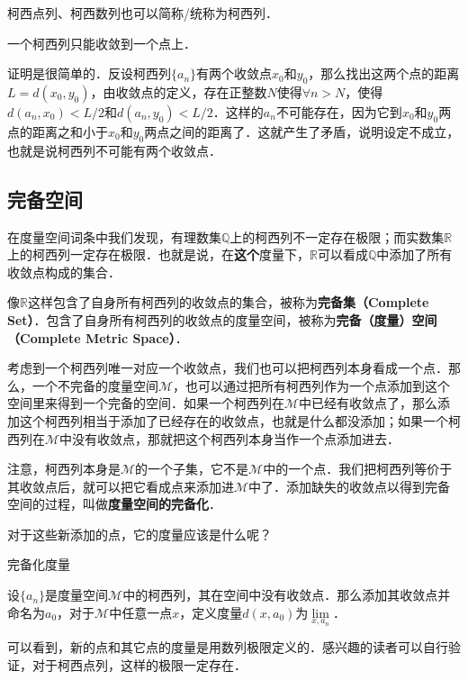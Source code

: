 柯西点列、柯西数列也可以简称/统称为柯西列．

一个柯西列只能收敛到一个点上．

\begin{theorem}{收敛点的唯一性}

给定度量空间$\mathcal{M}$，如果$\{a_n\}_{n=1}^{\infty$是一个柯西列，那么这个柯西列只收敛到一个点上．

\end{theorem}

证明是很简单的．反设柯西列$\{a_n\}$有两个收敛点$x_0$和$y_0$，那么找出这两个点的距离$L=d(x_0, y_0)$，由收敛点的定义，存在正整数$N$使得$\forall n>N$，使得$d(a_n, x_0)<L/2$和$d(a_n, y_0)<L/2$．这样的$a_n$不可能存在，因为它到$x_0$和$y_0$两点的距离之和小于$x_0$和$y_0$两点之间的距离了．这就产生了矛盾，说明设定不成立，也就是说柯西列不可能有两个收敛点．


\subsection{完备空间}

在度量空间词条中我们发现，有理数集$\mathbb{Q}$上的柯西列不一定存在极限；而实数集$\mathbb{R}$上的柯西列一定存在极限．也就是说，在\textbf{这个}度量下，$\mathbb{R}$可以看成$\mathbb{Q}$中添加了所有收敛点构成的集合．

像$\mathbb{R}$这样包含了自身所有柯西列的收敛点的集合，被称为\textbf{完备集（Complete Set）}．包含了自身所有柯西列的收敛点的度量空间，被称为\textbf{完备（度量）空间（Complete Metric Space）}．

考虑到一个柯西列唯一对应一个收敛点，我们也可以把柯西列本身看成一个点．那么，一个不完备的度量空间$\mathcal{M}$，也可以通过把所有柯西列作为一个点添加到这个空间里来得到一个完备的空间．如果一个柯西列在$\mathcal{M}$中已经有收敛点了，那么添加这个柯西列相当于添加了已经存在的收敛点，也就是什么都没添加；如果一个柯西列在$\mathcal{M}$中没有收敛点，那就把这个柯西列本身当作一个点添加进去．

注意，柯西列本身是$\mathcal{M}$的一个子集，它不是$\mathcal{M}$中的一个点．我们把柯西列等价于其收敛点后，就可以把它看成点来添加进$\mathcal{M}$中了．添加缺失的收敛点以得到完备空间的过程，叫做\textbf{度量空间的完备化}．

对于这些新添加的点，它的度量应该是什么呢？

\begin{definition}{完备化度量}

设$\{a_n\}$是度量空间$\mathcal{M}$中的柯西列，其在空间中没有收敛点．那么添加其收敛点并命名为$a_0$，对于$\mathcal{M}$中任意一点$x$，定义度量$d(x, a_0)$为$\lim\limits_{x, a_n}$．

\end{definition}

可以看到，新的点和其它点的度量是用数列极限定义的．感兴趣的读者可以自行验证，对于柯西点列，这样的极限一定存在．
